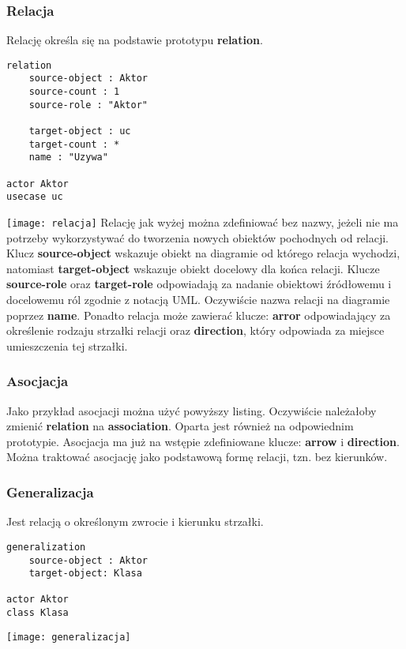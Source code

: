 \subsubsection{Relacja}

Relację określa się na podstawie prototypu \textbf{relation}.
\begin{lstlisting}
relation
    source-object : Aktor
    source-count : 1
    source-role : "Aktor"

    target-object : uc
    target-count : *
    name : "Uzywa"

actor Aktor
usecase uc
\end{lstlisting}
\texttt{[image: relacja]}
Relację jak wyżej można zdefiniować bez nazwy, jeżeli nie ma potrzeby wykorzystywać do tworzenia nowych obiektów pochodnych od relacji. Klucz \textbf{source-object} wskazuje obiekt na diagramie od którego relacja wychodzi, natomiast \textbf{target-object} wskazuje obiekt docelowy dla końca relacji. Klucze \textbf{source-role} oraz \textbf{target-role} odpowiadają za nadanie obiektowi źródłowemu i docelowemu ról zgodnie z notacją UML. Oczywiście nazwa relacji na diagramie poprzez \textbf{name}. Ponadto relacja może zawierać klucze: \textbf{arror} odpowiadający za określenie rodzaju strzałki relacji oraz \textbf{direction}, który odpowiada za miejsce umieszczenia tej strzałki.

\subsubsection{Asocjacja}

Jako przykład asocjacji można użyć powyższy listing. Oczywiście należałoby zmienić \textbf{relation} na \textbf{association}. Oparta jest również na odpowiednim prototypie. Asocjacja ma już na wstępie zdefiniowane klucze: \textbf{arrow} i \textbf{direction}. Można traktować asocjację jako podstawową formę relacji, tzn. bez kierunków.

\subsubsection{Generalizacja}

Jest relacją o określonym zwrocie i kierunku strzałki.
\begin{lstlisting}
generalization
    source-object : Aktor
    target-object: Klasa

actor Aktor
class Klasa
\end{lstlisting}
\texttt{[image: generalizacja]}

